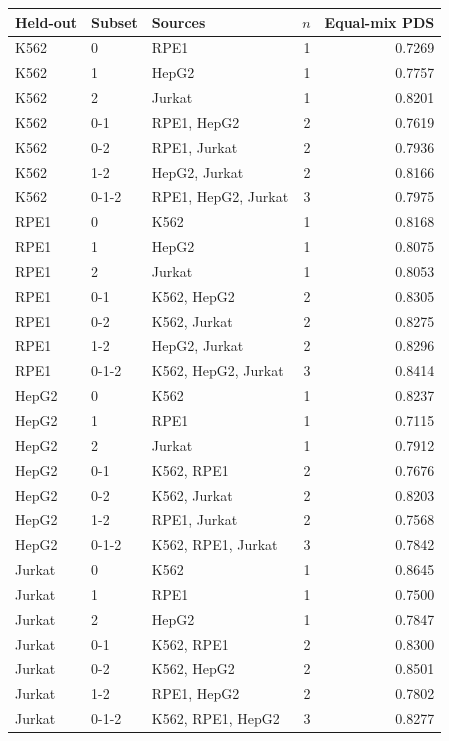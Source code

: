 \documentclass[12pt]{article}
\begin{document}
\begin{singlespace}
{\footnotesize
\setlength{\tabcolsep}{4pt}
\renewcommand{\arraystretch}{0.95}
\begin{tabular}{@{}lllrr@{}}
\toprule
Held-out & Subset & Sources & $n$ & Equal-mix PDS \\
\midrule
K562 & 0 & RPE1 & 1 & 0.7269 \\
K562 & 1 & HepG2 & 1 & 0.7757 \\
K562 & 2 & Jurkat & 1 & 0.8201 \\
K562 & 0-1 & RPE1, HepG2 & 2 & 0.7619 \\
K562 & 0-2 & RPE1, Jurkat & 2 & 0.7936 \\
K562 & 1-2 & HepG2, Jurkat & 2 & 0.8166 \\
K562 & 0-1-2 & RPE1, HepG2, Jurkat & 3 & 0.7975 \\
\midrule
RPE1 & 0 & K562 & 1 & 0.8168 \\
RPE1 & 1 & HepG2 & 1 & 0.8075 \\
RPE1 & 2 & Jurkat & 1 & 0.8053 \\
RPE1 & 0-1 & K562, HepG2 & 2 & 0.8305 \\
RPE1 & 0-2 & K562, Jurkat & 2 & 0.8275 \\
RPE1 & 1-2 & HepG2, Jurkat & 2 & 0.8296 \\
RPE1 & 0-1-2 & K562, HepG2, Jurkat & 3 & 0.8414 \\
\midrule
HepG2 & 0 & K562 & 1 & 0.8237 \\
HepG2 & 1 & RPE1 & 1 & 0.7115 \\
HepG2 & 2 & Jurkat & 1 & 0.7912 \\
HepG2 & 0-1 & K562, RPE1 & 2 & 0.7676 \\
HepG2 & 0-2 & K562, Jurkat & 2 & 0.8203 \\
HepG2 & 1-2 & RPE1, Jurkat & 2 & 0.7568 \\
HepG2 & 0-1-2 & K562, RPE1, Jurkat & 3 & 0.7842 \\
\midrule
Jurkat & 0 & K562 & 1 & 0.8645 \\
Jurkat & 1 & RPE1 & 1 & 0.7500 \\
Jurkat & 2 & HepG2 & 1 & 0.7847 \\
Jurkat & 0-1 & K562, RPE1 & 2 & 0.8300 \\
Jurkat & 0-2 & K562, HepG2 & 2 & 0.8501 \\
Jurkat & 1-2 & RPE1, HepG2 & 2 & 0.7802 \\
Jurkat & 0-1-2 & K562, RPE1, HepG2 & 3 & 0.8277 \\
\bottomrule
\end{tabular}
}


\end{singlespace}
\end{document}
